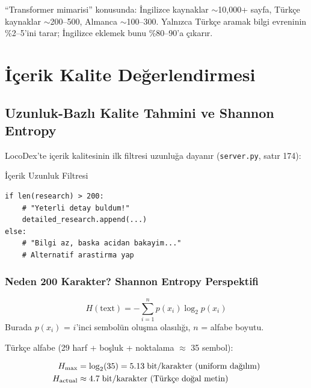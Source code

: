 ``Transformer mimarisi'' konusunda: \.{I}ngilizce kaynaklar $\sim$10{,}000+ sayfa, T\"{u}rk\c{c}e kaynaklar $\sim$200--500, Almanca $\sim$100--300. Yaln{\i}zca T\"{u}rk\c{c}e aramak bilgi evreninin \%2--5'ini tarar; \.{I}ngilizce eklemek bunu \%80--90'a \c{c}{\i}kar{\i}r.


\section{\.{I}\c{c}erik Kalite De\u{g}erlendirmesi}
\label{sec:content-quality}

\subsection{Uzunluk-Bazl{\i} Kalite Tahmini ve Shannon Entropy}

LocoDex'te i\c{c}erik kalitesinin ilk filtresi uzunlu\u{g}a dayan{\i}r (\texttt{server.py}, sat{\i}r 174):

\begin{kodref}{\.{I}\c{c}erik Uzunluk Filtresi}
\begin{lstlisting}
if len(research) > 200:
    # "Yeterli detay buldum!"
    detailed_research.append(...)
else:
    # "Bilgi az, baska acidan bakayim..."
    # Alternatif arastirma yap
\end{lstlisting}
\end{kodref}

\subsubsection{Neden 200 Karakter? Shannon Entropy Perspektifi}

\begin{formulbox}
\begin{equation}
\label{eq:shannon}
H(\text{text}) = -\sum_{i=1}^{n} p(x_i) \log_2 p(x_i)
\end{equation}
Burada $p(x_i)$ = $i$'inci sembol\"{u}n olu\c{s}ma olas{\i}l{\i}\u{g}{\i}, $n$ = alfabe boyutu.
\end{formulbox}

T\"{u}rk\c{c}e alfabe (29 harf + bo\c{s}luk + noktalama $\approx$ 35 sembol):

\begin{align}
H_{\max} &= \log_2(35) = 5.13 \;\text{bit/karakter (uniform da\u{g}{\i}l{\i}m)} \\
H_{\text{actual}} &\approx 4.7 \;\text{bit/karakter (T\"{u}rk\c{c}e do\u{g}al metin)}
\end{align}

